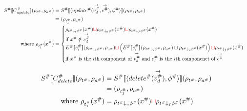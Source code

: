 

\begin{align*}
    S^\# \llbracket C^\#_{update} \rrbracket(\rho_{t^\#}, \rho_{a^\#})
                                              & = S^\# \llbracket \langle update^\#(\overset{\rightarrow}{v_d^\#}, \overset{\rightarrow}{e^\#}), \phi^\# \rangle \rrbracket (\rho_{t^\#}, \rho_{a^\#}) \\
                                              & = (\rho_{t^\#_1}, \rho_{a^\#})                                                                 \\
    \text{where } \rho_{t^\#_1}(x^\#) & =
    \begin{cases}
        \rho_{t^\# \downarrow_t \phi^\#}(x^\#) \textcolor{red}{\sqcup} \rho_{t^\# \downarrow_u \phi^\#}(x^\#) \textcolor{red}{\sqcup} \rho_{t^\# \downarrow_f \phi^\#}(x^\#)                             \\
        \text{if } x^\# \notin \overset{\rightarrow}{v_d^\#}                                                                                                                                                                                        \\
        E^\# \llbracket e^\#_{i} \rrbracket(\rho_{t^\# \downarrow_t \phi^\#}, \rho_{a^\#}) \textcolor{red}{\sqcup}
        \left( E^\# \llbracket e^\#_{i} \rrbracket(\rho_{t^\# \downarrow_u \phi^\#}, \rho_{a^\#}) \sqcup \rho_{t^\# \downarrow_u \phi^\#}(x^\#) \right) \textcolor{red}{\sqcup} \rho_{t^\# \downarrow_f \phi^\#}(x^\#) \\
        \text{if $x^\#$ is the $i$th component of $\overset{\rightarrow}{v_d^\#}$ and $e^\#_{i}$ is the $i$th componenet of $\overset{\rightarrow}{e^\#}$}                                                                                                           \\
    \end{cases}
\end{align*}

\begin{align*}
    S^\# \llbracket C^\#_{delete} \rrbracket(\rho_{t^\#}, \rho_{a^\#})
    &= S^\# \llbracket \langle delete^\#(\overset{\rightarrow}{v_d^\#}), \phi^\# \rangle \rrbracket (\rho_{t^\#}, \rho_{a^\#}) \\
    &= (\rho_{t^\#_1}, \rho_{a^\#}) \\
    \text{where } \rho_{t^\#_1}(x^\#) &= \rho_{t^\# \downarrow_u \phi^\#}(x^\#) \textcolor{red}{\sqcup} \rho_{t^\# \downarrow_f \phi^\#}(x^\#)
\end{align*}

